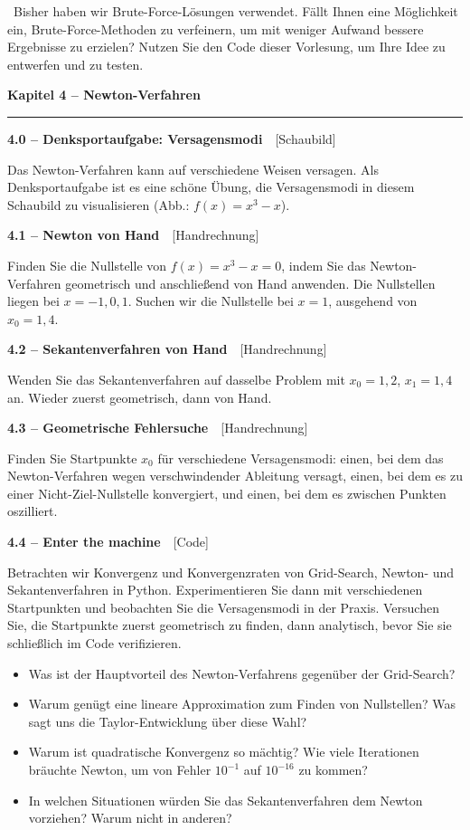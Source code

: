 \documentclass[a4paper,10pt]{article}
\newcommand{\kapitel}[1]{%
  \par\vspace{7pt}
  {\large\bfseries\color{accent} #1}\par
  \noindent\textcolor{accent}{\rule{\linewidth}{0.8pt}}\par\vspace{2pt}}
\newcommand{\aufg}[2]{%
  \par\vspace{3pt}
  {\bfseries\color{accent2} #1}~~{\footnotesize\color{accent2}[#2]}\par\vspace{1pt}}
\newcommand{\teaser}[1]{%
  \par\vspace{2pt}{\color{accent4}\textbf{Denkanstoß.}}~#1\par}
\newcommand{\reflexion}{%
  \par\vspace{2pt}{\bfseries\color{accent3} Selbstreflexionsfragen}\par\vspace{1pt}}
\begin{document}
\teaser{Bisher haben wir Brute-Force-Lösungen verwendet. Fällt Ihnen eine Möglichkeit
ein, Brute-Force-Methoden zu verfeinern, um mit weniger Aufwand bessere Ergebnisse zu
erzielen? Nutzen Sie den Code dieser Vorlesung, um Ihre Idee zu entwerfen und zu
testen.}

\kapitel{Kapitel 4 \;--\; Newton-Verfahren}

\aufg{4.0 \;--\; Denksportaufgabe: Versagensmodi}{Schaubild}
Das Newton-Verfahren kann auf verschiedene Weisen versagen. Als Denksportaufgabe ist
es eine schöne Übung, die Versagensmodi in diesem Schaubild zu visualisieren
(Abb.: $f(x)=x^3-x$).

\aufg{4.1 \;--\; Newton von Hand}{Handrechnung}
Finden Sie die Nullstelle von $f(x)=x^3-x=0$, indem Sie das Newton-Verfahren
geometrisch und anschließend von Hand anwenden. Die Nullstellen liegen bei
$x=-1,0,1$. Suchen wir die Nullstelle bei $x=1$, ausgehend von $x_0=1{,}4$.

\aufg{4.2 \;--\; Sekantenverfahren von Hand}{Handrechnung}
Wenden Sie das Sekantenverfahren auf dasselbe Problem mit $x_0=1{,}2$, $x_1=1{,}4$
an. Wieder zuerst geometrisch, dann von Hand.

\aufg{4.3 \;--\; Geometrische Fehlersuche}{Handrechnung}
Finden Sie Startpunkte $x_0$ für verschiedene Versagensmodi: einen, bei dem das
Newton-Verfahren wegen verschwindender Ableitung versagt, einen, bei dem es zu einer
Nicht-Ziel-Nullstelle konvergiert, und einen, bei dem es zwischen Punkten oszilliert.

\aufg{4.4 \;--\; Enter the machine}{Code}
Betrachten wir Konvergenz und Konvergenzraten von Grid-Search, Newton- und
Sekantenverfahren in Python. Experimentieren Sie dann mit verschiedenen Startpunkten
und beobachten Sie die Versagensmodi in der Praxis. Versuchen Sie, die Startpunkte
zuerst geometrisch zu finden, dann analytisch, bevor Sie sie schließlich im Code
verifizieren.

\reflexion
\begin{itemize}
  \item Was ist der Hauptvorteil des Newton-Verfahrens gegenüber der Grid-Search?
  \item Warum genügt eine lineare Approximation zum Finden von Nullstellen? Was sagt
        uns die Taylor-Entwicklung über diese Wahl?
  \item Warum ist quadratische Konvergenz so mächtig? Wie viele Iterationen bräuchte
        Newton, um von Fehler $10^{-1}$ auf $10^{-16}$ zu kommen?
  \item In welchen Situationen würden Sie das Sekantenverfahren dem Newton vorziehen?
        Warum nicht in anderen?
\end{itemize}
\end{document}
